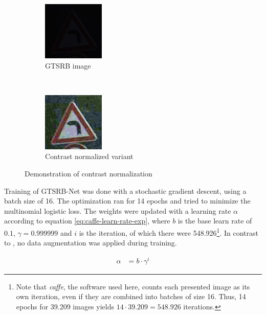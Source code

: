\documentclass[11pt, a4paper]{article}
\begin{document}
\begin{figure}[h!tb]
    \centering
    \begin{subfigure}[b]{0.45\textwidth}
    		\centering
        \includegraphics{gtsrb/problems/class19_00004_00029.jpg}
        \caption{GTSRB image}
        \label{fig:contrast-normalization-before}
    \end{subfigure}
    ~ %
    \begin{subfigure}[b]{0.45\textwidth}
    		\centering
        \includegraphics{gtsrb/problems/class19_00004_00029_normalized_contrast.jpg}
        \caption{Contrast normalized variant}
        \label{fig:contrast-normalization-after}
    \end{subfigure}
    \caption{Demonstration of contrast normalization}
    \label{fig:contrast-normalization}
\end{figure}

Training of GTSRB-Net was done with a stochastic gradient descent, using a batch size of 16. The optimization ran for 14 epochs and tried to minimize the multinomial logistic loss. The weights were updated with a learning rate $\alpha$ according to equation \eqref{eq:caffe-learn-rate-exp}, where $b$ is the base learn rate of $0.1$, $\gamma = 0.999999$ and $i$ is the iteration, of which there were 548.926\footnote{Note that \emph{caffe}, the software used here, counts each presented image as its own iteration, even if they are combined into batches of size 16. Thus, 14 epochs for 39.209 images yields $14 \cdot 39.209 = 548.926$ iterations.}. In contrast to \cite{multi-column-neural-network-gtsrb}, no data augmentation was applied during training.

\begin{align}
	\alpha &= b \cdot \gamma^i \label{eq:caffe-learn-rate-exp}
\end{align}
\end{document}
